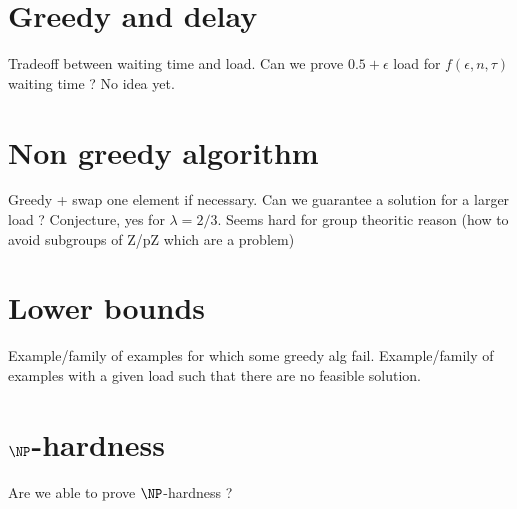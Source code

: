 \documentclass[10pt, conference, letterpaper]{IEEEtran}
\begin{document}
\section{Greedy and delay}

Tradeoff between waiting time and load. Can we prove $0.5 + \epsilon$ load for $f(\epsilon,n,\tau)$ waiting time ?  No idea yet.


\section{Non greedy algorithm}

Greedy + swap one element if necessary. 
Can we guarantee a solution for a larger load ? Conjecture, yes for $\lambda = 2/3$. 
Seems hard for group theoritic reason (how to avoid subgroups of Z/pZ which are a problem)

\section{Lower bounds}

Example/family of examples for which some greedy alg fail.
Example/family of examples with a given load such that there are no feasible solution.

\section{$\NP$-hardness}

Are we able to prove $\NP$-hardness ?

% 
% 
\end{document}
